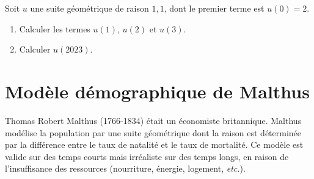 \documentclass[11pt]{article}
\begin{document}
\begin{app}
  Soit $u$ une suite géométrique de raison $1,1$, dont le premier terme est
  $u(0)=2$.
  \begin{enumerate}
    \item Calculer les termes $u(1)$, $u(2)$ et $u(3)$.
    \item Calculer $u(2023)$.
  \end{enumerate}
\end{app}

\section{Modèle démographique de Malthus}

Thomas Robert Malthus (1766-1834) était un économiste britannique. Malthus
modélise la population par une suite géométrique dont la raison est déterminée
par la différence entre le taux de natalité et le taux de mortalité. Ce modèle
est valide sur des temps courts mais irréaliste sur des temps longs, en raison
de l'insuffisance des ressources (nourriture, énergie, logement,
\emph{etc.}).
\end{document}
